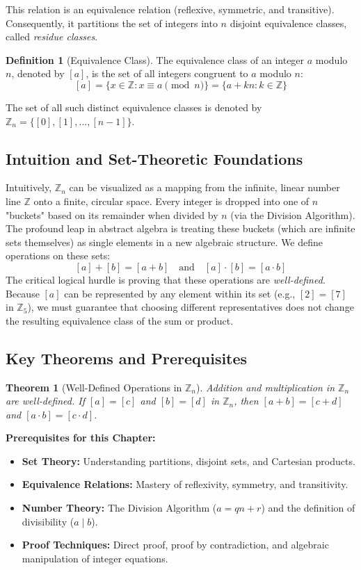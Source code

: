 \documentclass[11pt, a4paper]{article}
\newtheorem{theorem}{Theorem}[section]
\theoremstyle{definition}
\newtheorem{definition}{Definition}[section]
\theoremstyle{remark}
\newcommand{\Z}{\mathbb{Z}}
\begin{document}
This relation is an equivalence relation (reflexive, symmetric, and transitive). Consequently, it partitions the set of integers into $n$ disjoint equivalence classes, called \textit{residue classes}.

\begin{definition}[Equivalence Class]
The equivalence class of an integer $a$ modulo $n$, denoted by $[a]$, is the set of all integers congruent to $a$ modulo $n$:
\[
[a] = \{ x \in \Z : x \equiv a \pmod n \} = \{ a + kn : k \in \Z \}
\]
\end{definition}

The set of all such distinct equivalence classes is denoted by $\Z_n = \{[0], [1], \dots, [n-1]\}$. 

\subsection{Intuition and Set-Theoretic Foundations}
Intuitively, $\Z_n$ can be visualized as a mapping from the infinite, linear number line $\Z$ onto a finite, circular space. Every integer is dropped into one of $n$ "buckets" based on its remainder when divided by $n$ (via the Division Algorithm). The profound leap in abstract algebra is treating these buckets (which are infinite sets themselves) as single elements in a new algebraic structure. We define operations on these sets:
\[
[a] + [b] = [a + b] \quad \text{and} \quad [a] \cdot [b] = [a \cdot b]
\]
The critical logical hurdle is proving that these operations are \textit{well-defined}. Because $[a]$ can be represented by any element within its set (e.g., $[2] = [7]$ in $\Z_5$), we must guarantee that choosing different representatives does not change the resulting equivalence class of the sum or product.

\subsection{Key Theorems and Prerequisites}
\begin{theorem}[Well-Defined Operations in $\Z_n$]
Addition and multiplication in $\Z_n$ are well-defined. If $[a] = [c]$ and $[b] = [d]$ in $\Z_n$, then $[a + b] = [c + d]$ and $[a \cdot b] = [c \cdot d]$.
\end{theorem}

\textbf{Prerequisites for this Chapter:}
\begin{itemize}
    \item \textbf{Set Theory:} Understanding partitions, disjoint sets, and Cartesian products.
    \item \textbf{Equivalence Relations:} Mastery of reflexivity, symmetry, and transitivity.
    \item \textbf{Number Theory:} The Division Algorithm ($a = qn + r$) and the definition of divisibility ($a \mid b$).
    \item \textbf{Proof Techniques:} Direct proof, proof by contradiction, and algebraic manipulation of integer equations.
\end{itemize}
\end{document}
